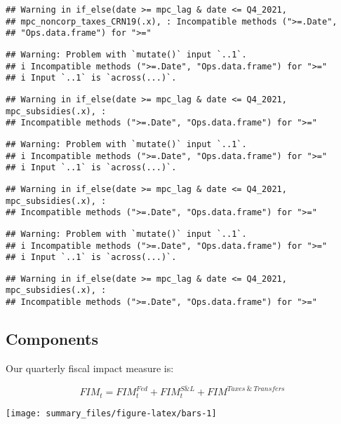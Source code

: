 \documentclass[
]{article}
\begin{document}
\begin{verbatim}
## Warning in if_else(date >= mpc_lag & date <= Q4_2021,
## mpc_noncorp_taxes_CRN19(.x), : Incompatible methods (">=.Date",
## "Ops.data.frame") for ">="
\end{verbatim}

\begin{verbatim}
## Warning: Problem with `mutate()` input `..1`.
## i Incompatible methods (">=.Date", "Ops.data.frame") for ">="
## i Input `..1` is `across(...)`.
\end{verbatim}

\begin{verbatim}
## Warning in if_else(date >= mpc_lag & date <= Q4_2021, mpc_subsidies(.x), :
## Incompatible methods (">=.Date", "Ops.data.frame") for ">="
\end{verbatim}

\begin{verbatim}
## Warning: Problem with `mutate()` input `..1`.
## i Incompatible methods (">=.Date", "Ops.data.frame") for ">="
## i Input `..1` is `across(...)`.
\end{verbatim}

\begin{verbatim}
## Warning in if_else(date >= mpc_lag & date <= Q4_2021, mpc_subsidies(.x), :
## Incompatible methods (">=.Date", "Ops.data.frame") for ">="
\end{verbatim}

\begin{verbatim}
## Warning: Problem with `mutate()` input `..1`.
## i Incompatible methods (">=.Date", "Ops.data.frame") for ">="
## i Input `..1` is `across(...)`.
\end{verbatim}

\begin{verbatim}
## Warning in if_else(date >= mpc_lag & date <= Q4_2021, mpc_subsidies(.x), :
## Incompatible methods (">=.Date", "Ops.data.frame") for ">="
\end{verbatim}

\hypertarget{components}{%
\subsection{Components}\label{components}}

Our quarterly fiscal impact measure is:

\[FIM_{t} = FIM^{Fed}_{t} + FIM^{S \&L}_{t}  + FIM^{Taxes \ \& \ Transfers}  \]

\begin{center}\texttt{[image: summary\_files/figure-latex/bars-1]} \end{center}
\end{document}
